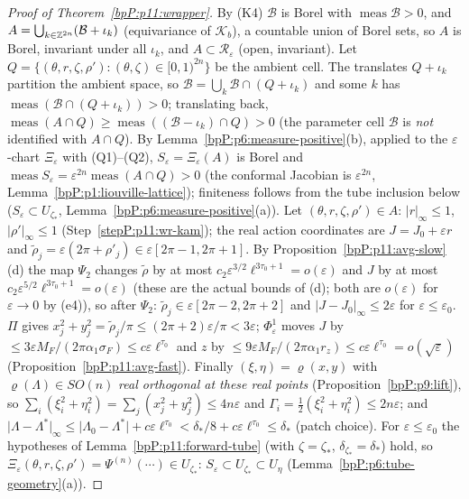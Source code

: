 \begin{proof}[Proof of Theorem~\ref{bpP:p11:wrapper}]
\label{stepP:p11:wr-meas} By (K4) $\mathcal B$ is Borel with $\operatorname{meas}\mathcal B>0$, and $A=\bigcup_{k\in\mathbb{Z}^{2n}}(\mathcal B+\iota_k)$ (equivariance of $\mathcal K_b$), a countable union of Borel sets, so $A$ is Borel, invariant under all $\iota_k$, and $A\subset\mathcal R_\varepsilon$ (open, invariant). Let $Q=\{(\theta,r,\zeta,\rho'):(\theta,\zeta)\in[0,1)^{2n}\}$ be the ambient cell. The translates $Q+\iota_k$ partition the ambient space, so $\mathcal B=\bigcup_k\mathcal B\cap(Q+\iota_k)$ and some $k$ has $\operatorname{meas}(\mathcal B\cap(Q+\iota_k))>0$; translating back, $\operatorname{meas}(A\cap Q)\ge\operatorname{meas}((\mathcal B-\iota_k)\cap Q)>0$ (the parameter cell $\mathcal B$ is \emph{not} identified with $A\cap Q$). By Lemma~\ref{bpP:p6:measure-positive}(b), applied to the $\varepsilon$-chart $\Xi_\varepsilon$ with (Q1)--(Q2), $S_\varepsilon=\Xi_\varepsilon(A)$ is Borel and $\operatorname{meas}S_\varepsilon=\varepsilon^{2n}\operatorname{meas}(A\cap Q)>0$ (the conformal Jacobian is $\varepsilon^{2n}$, Lemma~\ref{bpP:p1:liouville-lattice}); finiteness follows from the tube inclusion below ($S_\varepsilon\subset U_{\zeta_*}$, Lemma~\ref{bpP:p6:measure-positive}(a)).
\label{stepP:p11:wr-tube} Let $(\theta,r,\zeta,\rho')\in A$: $\lvert r\rvert_\infty\le1$, $\lvert\rho'\rvert_\infty\le1$ (Step~\ref{stepP:p11:wr-kam}); the real action coordinates are $J=J_0+\varepsilon r$ and $\tilde\rho_j=\varepsilon(2\pi+\rho'_j)\in\varepsilon[2\pi-1,2\pi+1]$. By Proposition~\ref{bpP:p11:avg-slow}(d) the map $\Psi_2$ changes $\tilde\rho$ by at most $c_2\varepsilon^{3/2}\ell^{3\tau_0+1}=o(\varepsilon)$ and $J$ by at most $c_2\varepsilon^{5/2}\ell^{3\tau_0+1}=o(\varepsilon)$ (these are the actual bounds of (d); both are $o(\varepsilon)$ for $\varepsilon\to0$ by (e4)), so after $\Psi_2$: $\tilde\rho_j\in\varepsilon[2\pi-2,2\pi+2]$ and $\lvert J-J_0\rvert_\infty\le2\varepsilon$ for $\varepsilon\le\varepsilon_0$. $\Pi$ gives $x_j^2+y_j^2=\tilde\rho_j/\pi\le(2\pi+2)\varepsilon/\pi<3\varepsilon$; $\Phi^1_\varepsilon$ moves $J$ by $\le3\varepsilon M_F/(2\pi\alpha_1\sigma_F)\le c\varepsilon\ell^{\tau_0}$ and $z$ by $\le9\varepsilon M_F/(2\pi\alpha_1r_z)\le c\varepsilon\ell^{\tau_0}=o(\sqrt\varepsilon)$ (Proposition~\ref{bpP:p11:avg-fast}). Finally $(\xi,\eta)=\varrho(x,y)$ with $\varrho(\Lambda)\in SO(n)$ \emph{real orthogonal at these real points} (Proposition~\ref{bpP:p9:lift}), so $\sum_i(\xi_i^2+\eta_i^2)=\sum_j(x_j^2+y_j^2)\le4n\varepsilon$ and $\Gamma_i=\frac12(\xi_i^2+\eta_i^2)\le2n\varepsilon$; and $\lvert\Lambda-\Lambda^*\rvert_\infty\le\lvert\Lambda_0-\Lambda^*\rvert+c\varepsilon\ell^{\tau_0}<\delta_*/8+c\varepsilon\ell^{\tau_0}\le\delta_*$ (patch choice). For $\varepsilon\le\varepsilon_0$ the hypotheses of Lemma~\ref{bpP:p11:forward-tube} (with $\zeta=\zeta_*$, $\delta_{\zeta_*}=\delta_*$) hold, so $\Xi_\varepsilon(\theta,r,\zeta,\rho')=\Psi^{(n)}(\cdots)\in U_{\zeta_*}$: $S_\varepsilon\subset U_{\zeta_*}\subset U_\eta$ (Lemma~\ref{bpP:p6:tube-geometry}(a)).
\end{proof}

